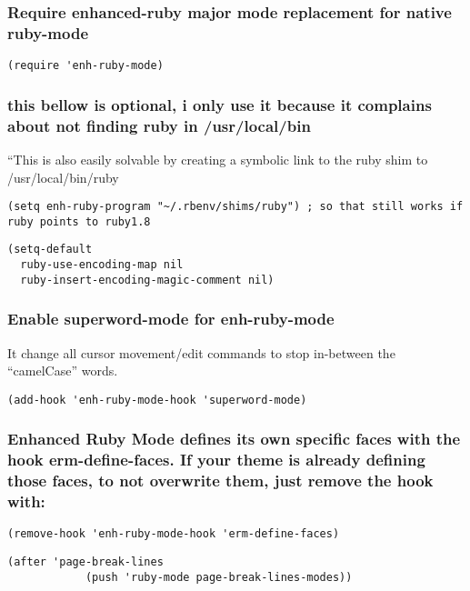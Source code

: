 \documentclass[11pt]{article}
\begin{document}
\subsubsection*{Require enhanced-ruby major mode replacement for native ruby-mode}
\label{sec:orgbc415b7}
\begin{verbatim}
(require 'enh-ruby-mode)
\end{verbatim}

\subsubsection*{this bellow is optional, i only use it because it complains about not finding ruby in /usr/local/bin}
\label{sec:org62103bc}
``This is also easily solvable by creating a symbolic link to the ruby shim to /usr/local/bin/ruby
\begin{verbatim}
(setq enh-ruby-program "~/.rbenv/shims/ruby") ; so that still works if ruby points to ruby1.8
\end{verbatim}

\begin{verbatim}
(setq-default
  ruby-use-encoding-map nil
  ruby-insert-encoding-magic-comment nil)
\end{verbatim}

\subsubsection*{Enable superword-mode for enh-ruby-mode}
\label{sec:org086a047}
It change all cursor movement/edit commands to stop in-between the “camelCase” words.

\begin{verbatim}
(add-hook 'enh-ruby-mode-hook 'superword-mode)
\end{verbatim}

\subsubsection*{Enhanced Ruby Mode defines its own specific faces with the hook erm-define-faces. If your theme is already defining those faces, to not overwrite them, just remove the hook with:}
\label{sec:org89eefcd}
\begin{verbatim}
(remove-hook 'enh-ruby-mode-hook 'erm-define-faces)
\end{verbatim}


\begin{verbatim}
(after 'page-break-lines
            (push 'ruby-mode page-break-lines-modes))
\end{verbatim}
\end{document}
